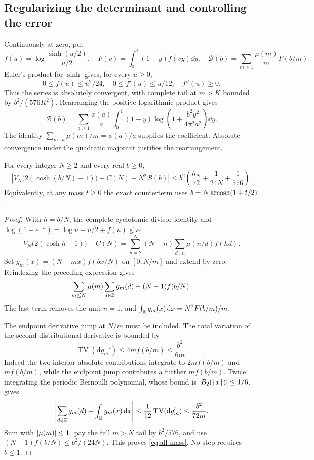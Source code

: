 \subsection{Regularizing the determinant and controlling the error}
Continuously at zero, put
\[
 f(u)=\log\frac{\sinh(u/2)}{u/2},\quad
 F(v)=\int_0^1(1-y)f(vy)\dd y,\quad
 \mathcal B(b)=\sum_{m\ge1}\frac{\mu(m)}mF(b/m).
\]
Euler's product for $\sinh$ gives, for every $u\ge0$,
\[
 0\le f(u)\le u^2/24,\quad 0\le f'(u)\le u/12,\quad f''(u)\ge0.
\]
Thus the series is absolutely convergent, with complete tail at $m>K$ bounded by $b^2/(576K^2)$. Rearranging the positive logarithmic product gives
\begin{equation}\label{eq:B-positive}
 \mathcal B(b)=\sum_{a\ge1}\frac{\phi(a)}a
 \int_0^1(1-y)\log\left(1+\frac{b^2y^2}{4\pi^2a^2}\right)\dd y.
\end{equation}
The identity $\sum_{m\mid a}\mu(m)/m=\phi(a)/a$ supplies the coefficient. Absolute convergence under the quadratic majorant justifies the rearrangement.

\begin{theorem}\label{thm:all-mass}
For every integer $N\ge2$ and every real $b\ge0$,
\begin{equation}\label{eq:all-mass}
 \left|V_N\bigl(2(\cosh(b/N)-1)\bigr)-C(N)-N^2\mathcal B(b)\right|
 \le b^2\left(\frac{h_N}{72}+\frac1{24N}+\frac1{576}\right).
\end{equation}
Equivalently, at any mass $t\ge0$ the exact counterterm uses $b=N\operatorname{arcosh}(1+t/2)$.
\end{theorem}
\begin{proof}
With $h=b/N$, the complete cyclotomic divisor identity and
$\log(1-e^{-u})=\log u-u/2+f(u)$ give
\[
 V_N\bigl(2(\cosh h-1)\bigr)-C(N)
 =\sum_{n=2}^N(N-n)\sum_{d\mid n}\mu(n/d)f(hd).
\]
Set $g_m(x)=(N-mx)f(bx/N)$ on $[0,N/m]$ and extend by zero. Reindexing the preceding expression gives
\[
 \sum_{m\le N}\mu(m)\sum_{d\in\mathbb Z}g_m(d)-(N-1)f(b/N).
\]
The last term removes the unit $n=1$, and
$\int_\mathbb R g_m(x)\,\mathrm d x=N^2F(b/m)/m$.

The endpoint derivative jump at $N/m$ must be included. The total variation of the second distributional derivative is bounded by
\[
 \operatorname{TV}(\mathrm dg_m')\le4m f(b/m)\le\frac{b^2}{6m}.
\]
Indeed the two interior absolute contributions integrate to $2mf(b/m)$ and $mf(b/m)$, while the endpoint jump contributes a further $mf(b/m)$. Twice integrating the periodic Bernoulli polynomial, whose bound is $\lvert B_2(\{x\})\rvert\le1/6$, gives
\[
 \left|\sum_{d\in\mathbb Z}g_m(d)-\int_\mathbb R g_m(x)\,\mathrm d x\right|
 \le\frac1{12}\operatorname{TV}(\mathrm dg_m')\le\frac{b^2}{72m}.
\]
Sum with $\lvert\mu(m)\rvert\le1$, pay the full $m>N$ tail by $b^2/576$, and use $(N-1)f(b/N)\le b^2/(24N)$. This proves \eqref{eq:all-mass}. No step requires $b\le1$.
\end{proof}

